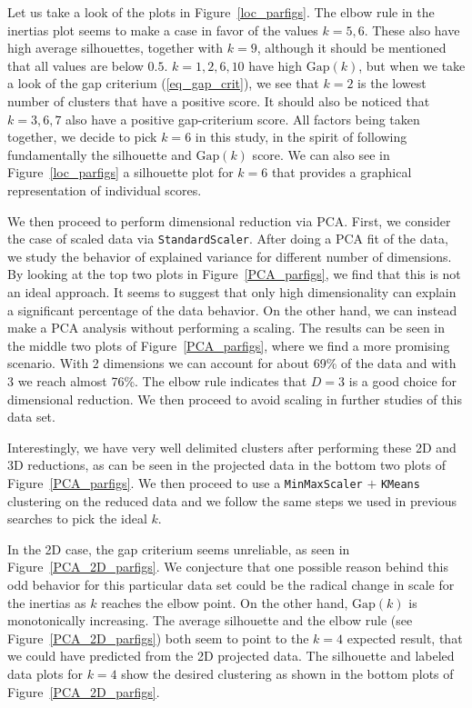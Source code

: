 \documentclass[12pt,a4paper]{article}
\begin{document}
Let us take a look of the plots in Figure~\ref{loc_parfigs}. The elbow rule in the inertias plot seems to make a case in favor of the values $k =5,6$. These also have high average silhouettes, together with $k=9$, although it should be mentioned that all values are below $0.5$. $k = 1, 2, 6, 10$ have high $\mathrm{Gap}(k)$, but when we take a look of the gap criterium (\ref{eq_gap_crit}), we see that $k=2$ is the lowest number of clusters that have a positive score. It should also be noticed that $k= 3, 6, 7$ also have a positive gap-criterium score. All factors being taken together, we decide to pick $k=6$ in this study, in the spirit of following fundamentally the silhouette and $\mathrm{Gap}(k)$ score. We can also see in Figure~\ref{loc_parfigs} a silhouette plot for $k=6$ that provides a graphical representation of individual scores.

We then proceed to perform dimensional reduction via PCA. First, we consider the case of scaled data via \verb|StandardScaler|. After doing a PCA fit of the data, we study the behavior of explained variance for different number of dimensions. By looking at the top two plots in Figure~\ref{PCA_parfigs}, we find that this is not an ideal approach.  It seems to suggest that only high dimensionality can explain a significant percentage of the data behavior. On the other hand, we can instead make a PCA analysis without performing a scaling. The results can be seen in the middle two plots of Figure~\ref{PCA_parfigs}, where we find a more promising scenario. With 2 dimensions we can account for about 69\% of the data and with 3 we reach almost 76\%. The elbow rule indicates that $D=3$ is a good choice for dimensional reduction. We then proceed to avoid scaling in further studies of this data set.

Interestingly, we have very well delimited clusters after performing these 2D and 3D reductions, as can be seen in the projected data in the bottom two plots of Figure~\ref{PCA_parfigs}. We then proceed to use a \verb|MinMaxScaler| $+$ \verb|KMeans| clustering on the reduced data and we follow the same steps we used in previous searches to pick the ideal $k$.

In the 2D case, the gap criterium seems unreliable, as seen in Figure~\ref{PCA_2D_parfigs}. We conjecture that one possible reason behind this odd behavior  for this particular data set could be the radical change in scale for the inertias as $k$ reaches the elbow point. On the other hand, $\mathrm{Gap}(k)$ is monotonically increasing. The average silhouette and the elbow rule (see Figure~\ref{PCA_2D_parfigs}) both seem to point to the $k=4$ expected result, that we could have predicted from the 2D projected data. The silhouette and labeled data plots for $k=4$ show the desired clustering as shown in the bottom plots of Figure~\ref{PCA_2D_parfigs}.
\end{document}
